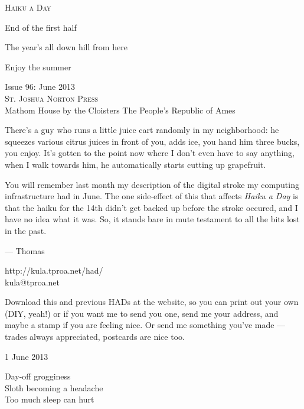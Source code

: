 \documentclass[12pt]{article}
\begin{document}
\begin{center}
{\fontsize{36}{48}\selectfont \textsc{Haiku a Day }}
\end{center}

\vspace*{3.5cm}

{\fontsize{20}{40}\selectfont 

End of the first half

The year's all down hill from here

Enjoy the summer


}

\vspace*{5.0cm}
\begin{center}
{\large{Issue 96: June 2013}} \\[5mm]
{\fontsize{8}{8}\selectfont  \textsc{ St. Joshua Norton Press }} \\[1mm]
{\fontsize{6}{6}\selectfont Mathom House by the Cloisters \textbar The People's Republic of Ames }
\end{center}


\newpage

There's a guy who runs a little juice cart randomly in my neighborhood: 
he squeezes various citrus juices in front of you, adds ice, you hand him
three bucks, you enjoy. It's gotten to the point now where I don't even
have to say anything, when I walk towards him, he automatically starts
cutting up grapefruit.

You will remember last month my description of the digital stroke my
computing infrastructure had in June. The one side-effect of this
that affects {\em Haiku a Day} is that the haiku for the 14th didn't
get backed up before the stroke occured, and I have no idea what it
was. So, it stands bare in mute testament to all the bits lost in the
past.

--- Thomas

http://kula.tproa.net/had/ \\
kula@tproa.net

Download this and previous HADs at the website, so you can
print out your own (DIY, yeah!) or if you want me to send
you one, send me your address, and maybe a stamp if you
are feeling nice. Or send me something you've made ---
trades always appreciated, postcards are nice too.

\vfill

1 June 2013

Day-off grogginess \\
Sloth becoming a headache \\
Too much sleep can hurt
\end{document}

